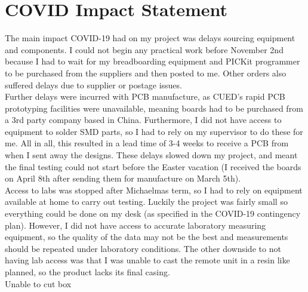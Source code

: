 \documentclass[draft]{IIBproject}
\begin{document}
\newpage
\section{COVID Impact Statement}
The main impact COVID-19 had on my project was delays sourcing equipment and components. I could not begin any practical work before November 2nd because I had to wait for my breadboarding equipment and PICKit programmer to be purchased from the suppliers and then posted to me. Other orders also suffered delays due to supplier or postage issues.\\

Further delays were incurred with PCB manufacture, as CUED's rapid PCB prototyping facilities were unavailable, meaning boards had to be purchased from a 3rd party company based in China. Furthermore, I did not have access to equipment to solder SMD parts, so I had to rely on my supervisor to do these for me. All in all, this resulted in a lead time of 3-4 weeks to receive a PCB from when I sent away the designs. These delays slowed down my project, and meant the final testing could not start before the Easter vacation (I received the boards on April 8th after sending them for manufacture on March 5th).\\

Access to labs was stopped after Michaelmas term, so I had to rely on equipment available at home to carry out testing. Luckily the project was fairly small so everything could be done on my desk (as specified in the COVID-19 contingency plan). However, I did not have access to accurate laboratory measuring equipment, so the quality of the data may not be the best and measurements should be repeated under laboratory conditions. The other downside to not having lab access was that I was unable to cast the remote unit in a resin like planned, so the product lacks its final casing.\\




Unable to cut box
\end{document}

